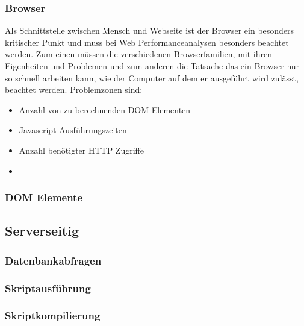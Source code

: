\subsubsection{Browser}
Als Schnittstelle zwischen Mensch und Webseite ist der Browser ein besonders kritischer Punkt und muss bei Web Performanceanalysen besonders beachtet werden. Zum einen müssen die verschiedenen Browserfamilien, mit ihren Eigenheiten und Problemen und zum anderen die Tatsache das ein Browser nur so schnell arbeiten kann, wie der Computer auf dem er ausgeführt wird zulässt, beachtet werden. Problemzonen sind:
\begin{itemize}
  \item Anzahl von zu berechnenden DOM-Elementen
  \item Javascript Ausführungszeiten
  \item Anzahl benötigter HTTP Zugriffe
  \item 

\end{itemize}

\subsubsection{DOM Elemente}
\subsection{Serverseitig}
\subsubsection{Datenbankabfragen}
\subsubsection{Skriptausführung}
\subsubsection{Skriptkompilierung}

